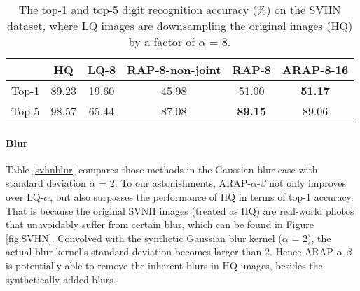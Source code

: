 \documentclass[10pt,twocolumn,twoside]{IEEEtran} %
\begin{document}
\begin{table}
	\fontsize{10pt}{12pt}\selectfont
	\caption{The top-1 and top-5 digit recognition accuracy (\%) on the SVHN dataset, where LQ images are downsampling the original images (HQ) by a factor of $\alpha$ = 8.}	
	\begin{center}
		\begin{tabular}{@{\hskip 1mm}c@{\hskip 1mm}|@{\hskip 1mm}c@{\hskip 1mm}|@{\hskip 1mm}c@{\hskip 1mm}|@{\hskip 1mm}c@{\hskip 1mm}|@{\hskip 1mm}c@{\hskip 1mm}|@{\hskip 1mm}c@{\hskip 1mm}}
			\hline
			& HQ & LQ-8 & RAP-8-non-joint & RAP-8 & ARAP-8-16 \\ \hline
			\hline
			Top-1 & 89.23 & 19.60 & 45.98 & 51.00 & \textbf{51.17} \\ 
			Top-5 & 98.57 & 65.44 & 87.08 & \textbf{89.15} & 89.06 \\ \hline
		\end{tabular}
	\end{center}
	
	\label{svhnlr}
\end{table}\paragraph{Blur}
Table \ref{svhnblur} compares those methods in the Gaussian blur case with standard deviation $\alpha$ = 2. To our astonishments, ARAP-$\alpha$-$\beta$ not only improves over LQ-$\alpha$, but also surpasses the performance of HQ in terms of top-1 accuracy. That is because the original SVNH images (treated as HQ) are real-world photos that unavoidably suffer from certain blur, which can be found in Figure \ref{fig:SVHN}. Convolved with the synthetic Gaussian blur kernel ($\alpha$ = 2), the actual blur kernel's standard deviation becomes larger than 2. 
Hence ARAP-$\alpha$-$\beta$ is potentially able to remove the inherent blurs in HQ images, besides the synthetically added blurs.
\end{document}
